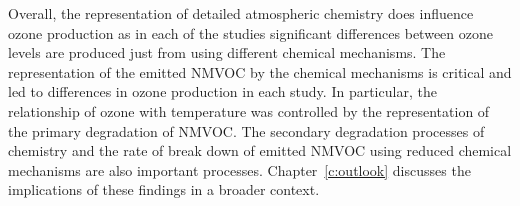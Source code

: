 Overall, the representation of detailed atmospheric chemistry does influence ozone production as in each of the studies significant differences between ozone levels are produced just from using different chemical mechanisms.
The representation of the emitted NMVOC by the chemical mechanisms is critical and led to differences in ozone production in each study.
In particular, the relationship of ozone with temperature was controlled by the representation of the primary degradation of NMVOC.
The secondary degradation processes of  chemistry and the rate of break down of emitted NMVOC using reduced chemical mechanisms are also important processes.
Chapter~\ref{c:outlook} discusses the implications of these findings in a broader context.
